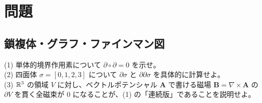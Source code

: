 \section{問題}

\subsection{鎖複体・グラフ・ファインマン図}

\begin{problem}[難易度 A]\label{ch04-prob-dd}
(1) 単体的境界作用素について $\partial\circ\partial=0$ を示せ。\\
(2) 四面体 $\sigma=[0,1,2,3]$ について $\partial\sigma$ と $\partial\partial\sigma$ を具体的に計算せよ。\\
(3) $\mathbb{R}^3$ の領域 $V$ に対し、ベクトルポテンシャル $\bm A$ で書ける磁場 $\bm B=\nabla\times\bm A$ の $\partial V$ を貫く全磁束が $0$ になることが、(1) の「連続版」であることを説明せよ。
\end{problem}

